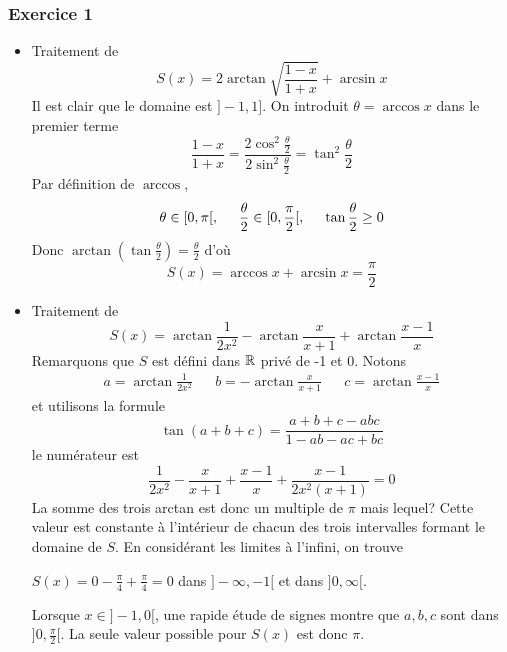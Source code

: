 \subsubsection*{Exercice 1}
\begin{itemize}
\item Traitement de
\begin{displaymath}
S(x)=2\arctan \sqrt{\frac{1-x}{1+x}}+\arcsin x  
\end{displaymath}
Il est clair que le domaine est $]-1,1]$. On introduit $\theta=\arccos x $ dans le premier terme
\begin{displaymath}
\frac{1-x}{1+x}=\frac{2\cos^2\frac{\theta}{2}}{2\sin^2\frac{\theta}{2}}=\tan^2 \frac{\theta}{2} 
\end{displaymath}
Par définition de $\arccos$,
\begin{displaymath}
 \theta \in [0,\pi[ ,\hspace{0.5cm} \frac{\theta}{2}\in[0,\frac{\pi}{2}[ , \hspace{0.5cm}\tan \frac{\theta}{2}\geq 0
\end{displaymath}
 Donc $\arctan (\tan \frac{\theta}{2})=\frac{\theta}{2}$ d'où
$$S(x)=\arccos x+\arcsin x=\frac{\pi}{2}$$

\item Traitement de 
\begin{displaymath}
 S(x)=\arctan\frac{1}{2x^2}-\arctan\frac{x}{x+1}+\arctan\frac{x-1}{x}
\end{displaymath}
Remarquons que $S$ est défini dans $\mathbb{R}$ privé de -1 et 0. Notons
\begin{align*}
a=\arctan\frac{1}{2x^2}  & &
b=-\arctan\frac{x}{x+1}  & &
c=\arctan\frac{x-1}{x}
\end{align*}
et utilisons la formule 
$$\tan(a+b+c)=\frac{a+b+c-abc}{1-ab-ac+bc}$$
le numérateur est
$$ \frac{1}{2x^2}-\frac{x}{x+1}+\frac{x-1}{x}+\frac{x-1}{2x^2(x+1)}=0$$
La somme des trois arctan est donc un multiple de $\pi$ mais lequel?\newline
Cette valeur est constante à l'intérieur de chacun des trois intervalles formant le domaine de $S$. En considérant les limites à l'infini, on trouve

$S(x)=0-\frac{\pi}{4}+\frac{\pi}{4}=0$ dans $]-\infty,-1[$ et dans $]0,\infty[$.

Lorsque $x\in ]-1,0[$, une rapide étude de signes montre que $a,b,c$ sont dans $]0,\frac{\pi}{2}[$. La seule valeur possible pour $S(x)$ est donc $\pi$.
\end{itemize}
%
